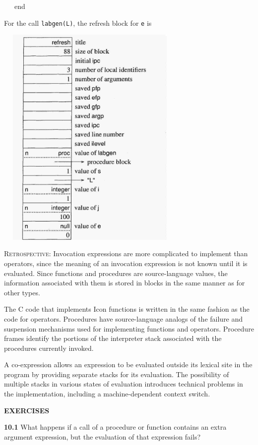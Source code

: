 {\ttfamily\mdseries
\ \ \ end}


For the call \texttt{labgen({\textquotedbl}L{\textquotedbl})}, the refresh block for \texttt{e} is


\ \  \includegraphics[width=3.3134in,height=4.3075in]{ib-img/ib-img088.jpg} 


\textsc{Retrospective}: Invocation expressions are more complicated to
implement than operators, since the meaning of an invocation
expression is not known until it is evaluated. Since functions and
procedures are source-language values, the information associated with
them is stored in blocks in the same manner as for other types.

The C code that implements Icon functions is written in the same
fashion as the code for operators. Procedures have source-language
analogs of the failure and suspension mechanisms used for implementing
functions and operators.  Procedure frames identify the portions of
the interpreter stack associated with the procedures currently
invoked.

A co-expression allows an expression to be evaluated outside its
lexical site in the program by providing separate stacks for its
evaluation. The possibility of multiple stacks in various states of
evaluation introduces technical problems in the implementation,
including a machine-dependent context switch.

{\sffamily\bfseries EXERCISES}

\textbf{10.1} What happens if a call of a procedure or function
contains an extra argument expression, but the evaluation of that
expression fails?


